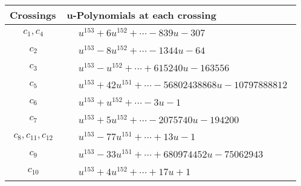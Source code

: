 \documentclass[1p]{elsarticle_modified}
\theoremstyle{definition}
\begin{document}
\begin{tabular}{m{50pt}|m{274pt}}
Crossings & \hspace{64pt}u-Polynomials at each crossing \\
\hline $$\begin{aligned}c_{1},c_{4}\end{aligned}$$&$\begin{aligned}
&u^{153}+6 u^{152}+\cdots-839 u-307
\end{aligned}$\\
\hline $$\begin{aligned}c_{2}\end{aligned}$$&$\begin{aligned}
&u^{153}-8 u^{152}+\cdots-1344 u-64
\end{aligned}$\\
\hline $$\begin{aligned}c_{3}\end{aligned}$$&$\begin{aligned}
&u^{153}- u^{152}+\cdots+615240 u-163556
\end{aligned}$\\
\hline $$\begin{aligned}c_{5}\end{aligned}$$&$\begin{aligned}
&u^{153}+42 u^{151}+\cdots-56802438868 u-10797888812
\end{aligned}$\\
\hline $$\begin{aligned}c_{6}\end{aligned}$$&$\begin{aligned}
&u^{153}+u^{152}+\cdots-3 u-1
\end{aligned}$\\
\hline $$\begin{aligned}c_{7}\end{aligned}$$&$\begin{aligned}
&u^{153}+5 u^{152}+\cdots-2075740 u-194200
\end{aligned}$\\
\hline $$\begin{aligned}c_{8},c_{11},c_{12}\end{aligned}$$&$\begin{aligned}
&u^{153}-77 u^{151}+\cdots+13 u-1
\end{aligned}$\\
\hline $$\begin{aligned}c_{9}\end{aligned}$$&$\begin{aligned}
&u^{153}-33 u^{151}+\cdots+680974452 u-75062943
\end{aligned}$\\
\hline $$\begin{aligned}c_{10}\end{aligned}$$&$\begin{aligned}
&u^{153}+4 u^{152}+\cdots+17 u+1
\end{aligned}$\\
\hline
\end{tabular}\\~\\
\end{document}

